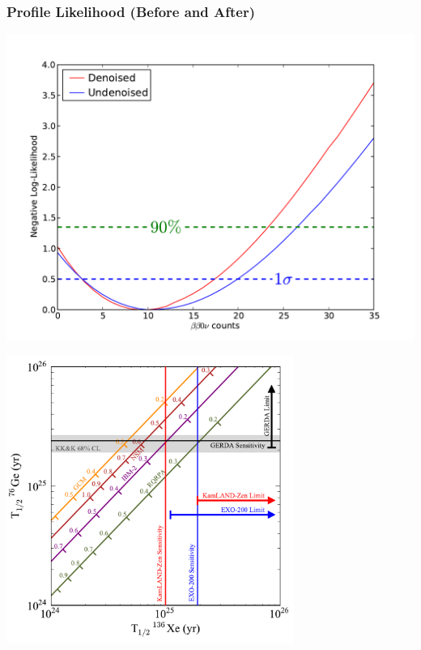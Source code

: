 \documentclass{beamer}
\begin{document}
\begin{frame}
\begin{center}
\frametitle{Profile Likelihood (Before and After)}
\end{center}
\vspace{0.6cm}
\begin{center}
\includegraphics[keepaspectratio=true,width=\textwidth]{DenoisedVsUndenoised_bb0nProfiles.pdf}
\end{center}
\end{frame}

\begin{frame}
\begin{center}
\includegraphics[keepaspectratio=true,width=3.7in]{MatplotLibSensitivity.pdf}
\end{center}
\end{frame}
\end{document}
